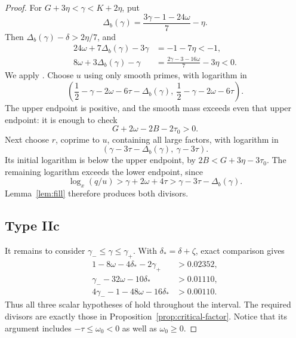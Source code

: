 \documentclass[11pt,reqno]{amsart}
\theoremstyle{definition}
\theoremstyle{remark}
\numberwithin{equation}{section}
\newcommand{\tmax}{\tau_0}
\newcommand{\gmin}{\gamma_-}
\newcommand{\gmax}{\gamma_+}
\begin{document}
\begin{proof}
For $G+3\eta<\gamma<K+2\eta$, put
\[
 \Delta_b(\gamma)=\frac{3\gamma-1-24\omega}{7}-\eta.
\]
Then $\Delta_b(\gamma)-\delta>2\eta/7$, and
\begin{align*}
 24\omega+7\Delta_b(\gamma)-3\gamma&=-1-7\eta<-1,\\
 8\omega+3\Delta_b(\gamma)-\gamma
   &=\frac{2\gamma-3-16\omega}{7}-3\eta<0.
\end{align*}
We apply \cite[Lemma~4]{Stadlmann26}. Choose $u$ using only smooth primes,
with logarithm in
\[
 \left(\frac12-\gamma-2\omega-6\tau-\Delta_b(\gamma),\
       \frac12-\gamma-2\omega-6\tau\right).
\]
The upper endpoint is positive, and the smooth mass exceeds even that
upper endpoint: it is enough to check
\begin{equation}\label{eq:IIb-smooth}
 G+2\omega-2B-2\tmax>0.
\end{equation}
Next choose $r$, coprime to $u$, containing all large factors, with
logarithm in
\[
 (\gamma-3\tau-\Delta_b(\gamma),\ \gamma-3\tau).
\]
Its initial logarithm is below the upper endpoint, by
$2B<G+3\eta-3\tmax$. The remaining logarithm exceeds the lower endpoint,
since
\[
 \log_x(q/u)>\gamma+2\omega+4\tau
             >\gamma-3\tau-\Delta_b(\gamma).
\]
Lemma~\ref{lem:fill} therefore produces both divisors.

\subsection*{Type IIc}
It remains to consider $\gmin\le\gamma\le\gmax$.
With $\delta_* =\delta+\zeta$, exact comparison gives
\begin{align}
 1-8\omega-4\delta_*-2\gmax&>0.02352,\label{eq:IIc-scalar-a}\\
 \gmin-32\omega-10\delta_*&>0.01110,\label{eq:IIc-scalar-b}\\
 4\gmin-1-48\omega-16\delta_*&>0.00110.\label{eq:IIc-scalar-c}
\end{align}
Thus all three scalar hypotheses of
\cite[Lemma~6]{Stadlmann26} hold throughout the interval. The required
divisors are exactly those in
Proposition~\ref{prop:critical-factor}. Notice that its argument includes
$-\tau\le\omega_0<0$ as well as $\omega_0\ge0$.


\end{proof}
\end{document}
